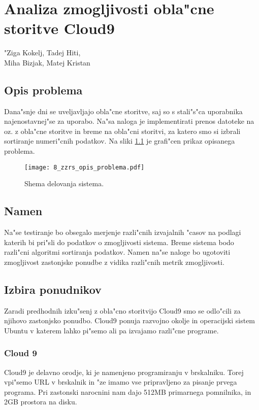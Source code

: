 \chapter[Analiza zmogljivosti obla"cne storitve c9]{Analiza zmogljivosti obla"cne storitve Cloud9}

\pagestyle{fancy}
\fancyhf{}
\fancyhead[LE,RO]{\thepage}
\fancyhead[RE,LO]{\leftmark}

\huge "Ziga Kokelj, Tadej Hiti,\\Miha Bizjak, Matej Kristan
\normalsize
\bigskip

\section{Opis problema} \label{8_opis_problema}
\noindent Dana"snje dni se uveljavljajo obla"cne storitve, saj so s stali"s"ca uporabnika najenostavnej"se za uporabo. Na"sa naloga je implementirati prenos datoteke na oz. z obla"cne storitve in breme na obla"cni storitvi, za katero smo si izbrali sortiranje numeri"cnih podatkov.
\noindent Na sliki \ref{8_opis_problema} je grafi"cen prikaz opisanega problema.

\begin{figure}
  \centering
    \texttt{[image: 8\_zzrs\_opis\_problema.pdf]}
  \caption{Shema delovanja sistema.}
  \label{8_opis_problema}
\end{figure}


\section{Namen}
Na"se testiranje bo obsegalo merjenje razli"cnih izvajalnih "casov na podlagi katerih bi pri"sli do podatkov o zmogljivosti sistema. Breme sistema bodo razli"cni algoritmi sortiranja podatkov. Namen na"se naloge bo ugotoviti zmogljivost zastonjske ponudbe z vidika razli"cnih metrik zmogljivosti.


\section{Izbira ponudnikov}
Zaradi predhodnih izku"senj z obla"cno storitvijo Cloud9 smo se odlo"cili za njihovo zastonjsko ponudbo. Cloud9 ponuja razvojno okolje in operacijski sistem Ubuntu v katerem lahko pi"semo ali pa izvajamo razli"cne programe.

\subsection{Cloud 9}
Cloud9 je delavno orodje, ki je namenjeno programiranju v brskalniku. Torej vpi"semo URL v brskalnik in "ze imamo vse pripravljeno za pisanje prvega programa. Pri zastonski narocnini nam dajo 512MB primarnega pomnilnika, in 2GB prostora na disku.

